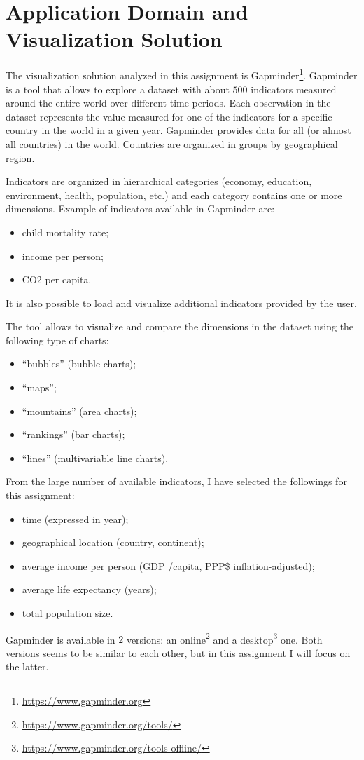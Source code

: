 \section{Application Domain and Visualization Solution}
\label{sec:visualization_solution}

The visualization solution analyzed in this assignment is Gapminder\footnote{\url{https://www.gapminder.org}}.
Gapminder is a tool that allows to explore a dataset with about $500$ indicators measured around the entire world over different time periods.
Each observation in the dataset represents the value measured for one of the indicators for a specific country in the world in a given year.
Gapminder provides data for all (or almost all countries) in the world.
Countries are organized in groups by geographical region.

Indicators are organized in hierarchical categories (economy, education, environment, health, population, etc.) and each category contains one or more dimensions.
Example of indicators available in Gapminder are:
\begin{itemize}
    \item child mortality rate;
    \item income per person;
    \item CO2 per capita.
\end{itemize}
It is also possible to load and visualize additional indicators provided by the user.

The tool allows to visualize and compare the dimensions in the dataset using the following type of charts:
\begin{itemize}
    \item ``bubbles'' (bubble charts);
    \item ``maps'';
    \item ``mountains'' (area charts);
    \item ``rankings'' (bar charts);
    \item ``lines'' (multivariable line charts).
\end{itemize}

\vspace{3mm}

From the large number of available indicators, I have selected the followings for this assignment:
\begin{itemize}
    \item time (expressed in year);
    \item geographical location (country, continent);
    \item average income per person (GDP /capita, PPP\$ inflation-adjusted);
    \item average life expectancy (years);
    \item total population size.
\end{itemize}

Gapminder is available in $2$ versions: an online\footnote{\url{https://www.gapminder.org/tools/}} and a desktop\footnote{\url{https://www.gapminder.org/tools-offline/}} one.
Both versions seems to be similar to each other, but in this assignment I will focus on the latter.
